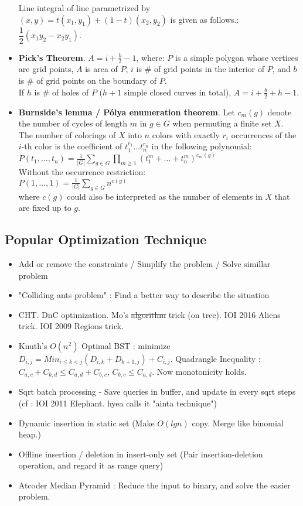 \documentclass[landscape, 8pt, a4paper, oneside, twocolumn]{extarticle}
\begin{document}
\begin{itemize}
    Line integral of line parametrized by $(x, y) = t(x_1, y_1) + (1-t)(x_2, y_2)$ is given as follows.: $\dfrac{1}{2} (x_1 y_2 - x_2 y_1)$.
    \item \textbf{Pick's Theorem}. $A=i+\frac{b}{2}-1$, where: $P$ is a simple polygon whose vertices are grid points, $A$ is area of $P$, $i$ is \# of grid points in the interior of $P$, and $b$ is \# of grid points on the boundary of $P$. \\
    If $h$ is \# of holes of $P$ ($h+1$ simple closed curves in total), $A=i+\frac{b}{2}+h-1$.
    \item \textbf{Burnside's lemma / Pólya enumeration theorem}. Let $c_m(g)$ denote the number of cycles of length $m$ in $g \in G$ when permuting a finite set $X$. The number of colorings of $X$ into $n$ colors with exactly $r_i$ occurrences of the $i$-th color is the coefficient of $t_1^{r_1}\ldots t_n^{r_n}$ in the following polynomial: \\ $P(t_1,\ldots,t_n)=\frac{1}{\left|G\right|}\sum_{g\in G}\prod_{m\ge 1}(t_1^m+\ldots +t_n^m)^{c_m(g)}$ \\

    Without the occurrence restriction: \\
    $P(1,\ldots,1)=\frac{1}{\left|G\right|}\sum_{g\in G}n^{c(g)}$ \\
    where $c(g)$ could also be interpreted as the number of elements in $X$ that are fixed up to $g$.
\end{itemize}

\subsection {Popular Optimization Technique}
\begin{itemize}
	\item Add or remove the constraints / Simplify the problem / Solve simillar problem
	\item "Colliding ants problem" : Find a better way to describe the situation
	\item CHT. DnC optimization. Mo's \sout{algorithm} trick (on tree). IOI 2016 Aliens trick. IOI 2009 Regions trick.
	\item Knuth's $O(n^2)$ Optimal BST : minimize $D_{i, j} = Min_{i \leq k < j}(D_{i, k} + D_{k+1, j}) + C_{i, j}$. Quadrangle Inequality : $C_{a, c} + C_{b, d} \leq C_{a, d} + C_{b, c}$, $C_{b, c} \leq C_{a, d}$. Now monotonicity holds.
	\item Sqrt batch processing - Save queries in buffer, and update in every sqrt steps (cf : IOI 2011 Elephant. hyea calls it "ainta technique")
	\item Dynamic insertion in static set (Make $O(lgn)$ copy. Merge like binomial heap.)
	\item Offline insertion / deletion in insert-only set (Pair insertion-deletion operation, and regard it as range query)
	\item Atcoder Median Pyramid : Reduce the input to binary, and solve the easier problem.
\end{itemize}
\end{document}

